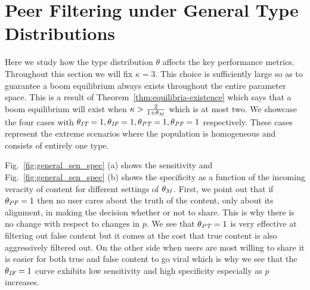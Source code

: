 




\section{Peer Filtering under General Type Distributions}\label{sec:gentyperes}
Here we study how the type distribution $\theta$ affects the key performance metrics. Throughout this section we will fix $\kappa=3$. This choice is sufficiently large so as to guarantee a boom equilibrium always exists throughout the entire parameter space. This is a result of Theorem~\ref{thm:equilibria-existence} which says that a boom equilibrium will exist when $\kappa > \frac{2}{1+\theta_M}$ which is at most two.   We showcase the four cases with $\theta_{\textit{IT}}=1, \theta_{\textit{IF}}=1, \theta_{\textit{PT}}=1, \theta_{\textit{PF}}=1$ respectively.  These cases represent the extreme scenarios where the population is homogeneous and consists of entirely one type.

Fig.~\ref{fig:general_sen_spec} (a) shows the sensitivity and Fig.~\ref{fig:general_sen_spec} (b) shows the specificity as a function of the incoming veracity of content for different settings of $\theta_M$.  First, we point out that if $\theta_{\textit{PF}}=1$ then no user cares about the truth of the content, only about its alignment, in making the decision whether or not to share. This is why there is no change with respect to changes in $p$.  We see that $\theta_{\textit{PT}} = 1$ is very effective at filtering out false content but it comes at the cost that true content is also aggressively filtered out. On the other side when users are most willing to share it is easier for both true and false content to go viral which is why we see that the $\theta_{\textit{IF}}=1$ curve exhibits low sensitivity and high specificity especially as $p$ increases. 


